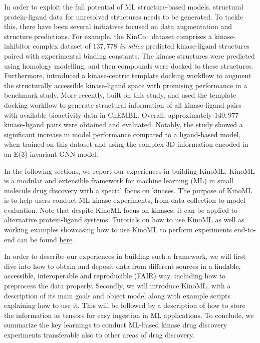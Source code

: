 \documentclass[9pt,lessons]{livecoms}
\newcommand{\revision}[1]{\textcolor{black}{#1}}
\begin{document}
In order to exploit the full potential of ML structure-based models, structural protein-ligand data for unresolved structures needs to be generated. 
To tackle this, there have been several initiatives focused on data augmentation and structure predictions. 
For example, the KinCo~\cite{liu2023hybrid} dataset comprises a kinase-inhibitor complex dataset of $137,778$ \textit{in silico} predicted kinase-ligand structures paired with experimental binding constants. 
The kinase structures were predicted using homology modelling, and then compounds were docked to these structures. Furthermore, \citet{schaller2023benchmarking} introduced a kinase-centric template docking workflow to augment the structurally accessible kinase-ligand space with promising performance in a benchmark study. 
More recently, \citet{backenkohler2023guided} built on this study, and used the template docking workflow to generate structural information of all kinase-ligand pairs with available bioactivity data in ChEMBL.
Overall, approximately $140,977$ kinase-ligand pairs were obtained and evaluated.
Notably, the study showed a significant increase in model performance \revision{compared to a ligand-based model}, when trained on this dataset and using the complex 3D information encoded in an E(3)-invariant GNN model.

In the following sections, we report our experiences in building KinoML. KinoML is a modular and extensible framework for machine learning (ML) in small molecule drug discovery with a special focus on kinases. The purpose of KinoML is to help users conduct ML kinase experiments, from data collection to model evaluation. Note that despite KinoML \revision{focus on kinases}, it can be applied to alternative protein\revision{-ligand} systems. Tutorials on how to use KinoML as well as working examples showcasing how to use KinoML to perform experiments end-to-end can be found \href{https://github.com/openkinome/kinoml/tree/v1.0.0/tutorials}{here}. 


In order to describe our experiences in building such a framework, we will first dive into how to obtain and deposit data from different sources in a \revision{findable, accessible, interoperable and reproducible (FAIR)  \cite{wilkinson_2016_scientificdata} } way, including how to preprocess the data properly. 
Secondly, we will introduce KinoML, with a description of its main goals and object model along with example scripts explaining how to use it. 
This will be followed by a description of how to store the information as tensors for easy ingestion in ML applications. 
To conclude, we summarize the key learnings to conduct ML-based kinase drug discovery experiments transferable also to other areas of drug discovery.
\end{document}
